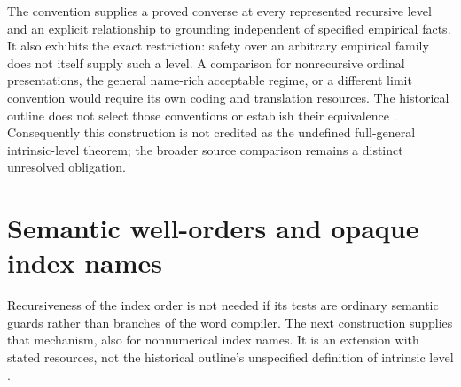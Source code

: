 The convention supplies a proved converse at every represented
recursive level and an explicit relationship to grounding independent
of specified empirical facts. It also exhibits the exact restriction:
safety over an arbitrary empirical family does not itself supply such
a level. A comparison for nonrecursive ordinal presentations, the
general name-rich acceptable regime, or a different limit convention
would require its own coding and translation resources. The historical
outline does not select those conventions or establish their equivalence
\cite[pp.~697, 710]{Kripke1975}. Consequently this construction
is not credited as the undefined full-general intrinsic-level theorem;
the broader source comparison remains a distinct unresolved obligation.

\section{Semantic well-orders and opaque index names}

Recursiveness of the index order is not needed if its tests are ordinary
semantic guards rather than branches of the word compiler. The next
construction supplies that mechanism, also for nonnumerical index names.
It is an extension with stated resources, not the historical outline's
unspecified definition of intrinsic level \cite[p.~710]{Kripke1975}.

